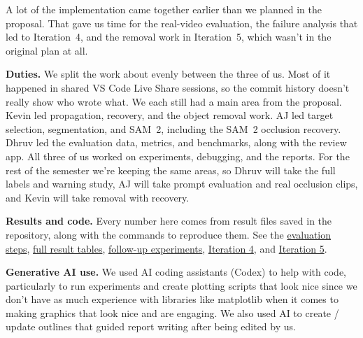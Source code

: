 \documentclass[10pt,letterpaper]{article}
\begin{document}
A lot of the implementation came together earlier than we planned in the proposal. That gave us
time for the real-video evaluation, the failure analysis that led to Iteration~4, and the removal
work in Iteration~5, which wasn't in the original plan at all.

\textbf{Duties.} We split the work about evenly between the three of us. Most of it happened in
shared VS Code Live Share sessions, so the commit history doesn't really show who wrote what. We
each still had a main area from the proposal. Kevin led propagation, recovery, and the object
removal work. AJ led target selection, segmentation, and SAM~2, including the SAM~2 occlusion
recovery. Dhruv led the evaluation data, metrics, and benchmarks, along with the review app. All
three of us worked on experiments, debugging, and the reports. For the rest of the semester we're
keeping the same areas, so Dhruv will take the full labels and warning study, AJ will take prompt
evaluation and real occlusion clips, and Kevin will take removal with recovery.

\textbf{Results and code.} Every number here comes from result files saved in the repository,
along with the commands to reproduce them. See the
\href{https://github.com/kevins4202/redactor/blob/main/docs/evaluation.md}{evaluation steps},
\href{https://github.com/kevins4202/redactor/blob/main/docs/results.md}{full result tables},
\href{https://github.com/kevins4202/redactor/blob/main/docs/proposal-followup.md}{follow-up experiments},
\href{https://github.com/kevins4202/redactor/blob/occlusion-recovery/docs/occlusion-recovery.md}{Iteration 4},
and \href{https://github.com/kevins4202/redactor/blob/temporal-object-removal/results/README.md}{Iteration 5}.

\textbf{Generative AI use.} We used AI coding assistants (Codex) to help with code,
particularly to run experiments and create plotting scripts that look nice since we don't have as much experience with libraries like matplotlib when it comes to making graphics that look nice and are engaging. 
We also used AI to create / update outlines that guided report writing after being edited by us. 
\end{document}
